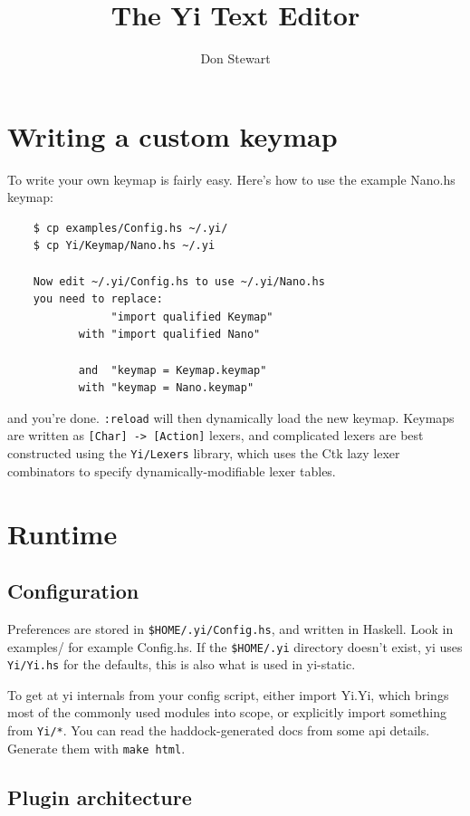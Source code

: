 \documentclass[]{article}
\title{The Yi Text Editor}
\author{Don Stewart}
\newcommand{\code}[1]{\texttt{#1}}
\begin{document}
\maketitle

\section{Writing a custom keymap}

To write your own keymap is fairly easy. Here's how to use the example
Nano.hs keymap:
\begin{verbatim}
    $ cp examples/Config.hs ~/.yi/
    $ cp Yi/Keymap/Nano.hs ~/.yi

    Now edit ~/.yi/Config.hs to use ~/.yi/Nano.hs
    you need to replace:
                "import qualified Keymap" 
           with "import qualified Nano"

           and  "keymap = Keymap.keymap"
           with "keymap = Nano.keymap"
\end{verbatim}

and you're done. \texttt{:reload} will then dynamically load the new
keymap. Keymaps are written as \code{[Char] -> [Action]} lexers, and
complicated lexers are best constructed using the \code{Yi/Lexers}
library, which uses the Ctk lazy lexer combinators to specify
dynamically-modifiable lexer tables.

\section{Runtime}

\subsection{Configuration}

Preferences are stored in \code{\$HOME/.yi/Config.hs}, and written in
Haskell. Look in examples/ for example Config.hs. If the
\code{\$HOME/.yi} directory doesn't exist, yi uses \code{Yi/Yi.hs} for
the defaults, this is also what is used in yi-static.

To get at yi internals from your config script, either import Yi.Yi,
which brings most of the commonly used modules into scope, or explicitly
import something from \code{Yi/*}. You can read the haddock-generated
docs from some api details. Generate them with \code{make html}.

\subsection{Plugin architecture}
\end{document}
